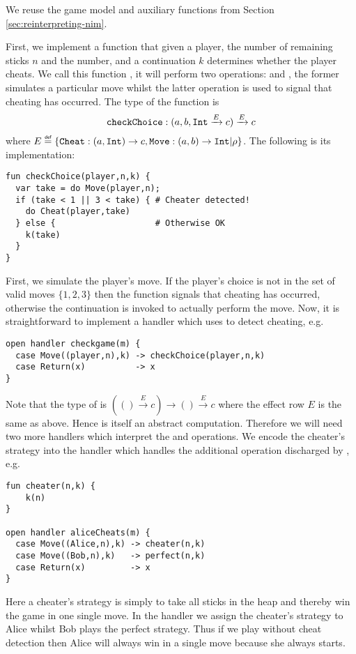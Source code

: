 We reuse the game model and auxiliary functions from Section \ref{sec:reinterpreting-nim}.
\begin{example}\label{ex:nim-cheat-detection}
First, we implement a function that given a player, the number of remaining sticks $n$ and the number, and a continuation $k$ determines whether the player cheats. We call this function , it will perform two operations:  and , the former simulates a particular move whilst the latter operation is used to signal that cheating has occurred. The type of the function is
\[
\texttt{checkChoice} : (a, b, \texttt{Int} \xrightarrow{E} c) \xrightarrow{E} c
\] 
where $E \defas \{\type{Cheat}:(a, \type{Int}) \to c,\type{Move}:(a, b) \to \type{Int}|\rho\}$. The following is its implementation:
\begin{lstlisting}[style=links]
fun checkChoice(player,n,k) {
  var take = do Move(player,n);
  if (take < 1 || 3 < take) { # Cheater detected!
    do Cheat(player,take)
  } else {                    # Otherwise OK
    k(take)
  }
}
\end{lstlisting}
First, we simulate the player's move. If the player's choice is not in the set of valid moves $\{1,2,3\}$ then the function signals that cheating has occurred, otherwise the continuation  is invoked to actually perform the move. Now, it is straightforward to implement a handler which uses  to detect cheating, e.g.
\begin{lstlisting}[style=links]
open handler checkgame(m) {
  case Move((player,n),k) -> checkChoice(player,n,k)
  case Return(x)          -> x
}
\end{lstlisting}
Note that the type of  is $(() \xrightarrow{E} c) \to () \xrightarrow{E} c$ where the effect row $E$ is the same as above. Hence  is itself an abstract computation.
Therefore we will need two more handlers which interpret the  and  operations. We encode the cheater's strategy into the handler which handles the additional  operation discharged by , e.g.
\begin{lstlisting}[style=links]
fun cheater(n,k) {
    k(n)
}

open handler aliceCheats(m) {
  case Move((Alice,n),k) -> cheater(n,k)
  case Move((Bob,n),k)   -> perfect(n,k)
  case Return(x)         -> x
}
\end{lstlisting}
Here a cheater's strategy is simply to take all sticks in the heap and thereby win the game in one single move. In the handler  we assign the cheater's strategy to Alice whilst Bob plays the perfect strategy. Thus if we play without cheat detection then Alice will always win in a single move because she always starts.


\end{example}
